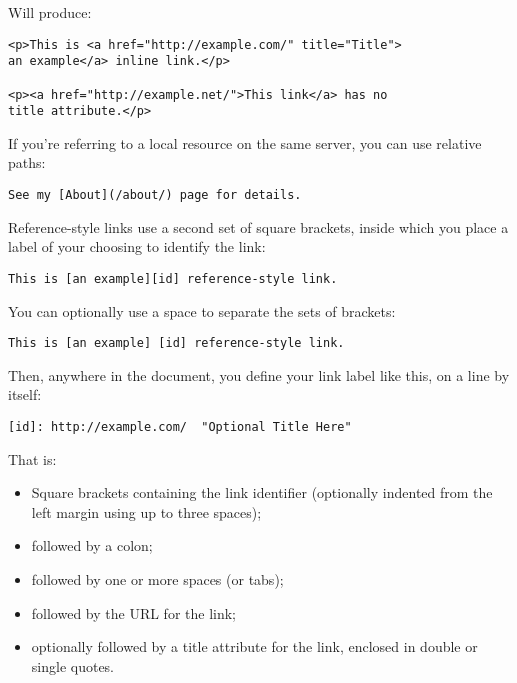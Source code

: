 Will produce:

\begin{lstlisting}
<p>This is <a href="http://example.com/" title="Title">
an example</a> inline link.</p>

<p><a href="http://example.net/">This link</a> has no
title attribute.</p>
\end{lstlisting}




If you're referring to a local resource on the same server, you can
use relative paths:

\begin{lstlisting}
See my [About](/about/) page for details.
\end{lstlisting}




Reference-style links use a second set of square brackets, inside
which you place a label of your choosing to identify the link:

\begin{lstlisting}
This is [an example][id] reference-style link.
\end{lstlisting}




You can optionally use a space to separate the sets of brackets:

\begin{lstlisting}
This is [an example] [id] reference-style link.
\end{lstlisting}




Then, anywhere in the document, you define your link label like this,
on a line by itself:

\begin{lstlisting}
[id]: http://example.com/  "Optional Title Here"
\end{lstlisting}




That is:

\begin{itemize}
\item Square brackets containing the link identifier (optionally
indented from the left margin using up to three spaces);
\item followed by a colon;
\item followed by one or more spaces (or tabs);
\item followed by the URL for the link;
\item optionally followed by a title attribute for the link, enclosed
in double or single quotes.
\end{itemize}




